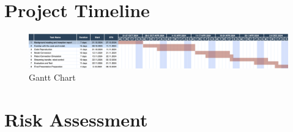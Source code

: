 \documentclass[12pt]{article}
\begin{document}
\section{Project Timeline}
\begin{figure}[H]
            \centering
            \includegraphics[width=\textwidth]{timeline.png}
            \caption{Gantt Chart}
      \end{figure}
      
\section{Risk Assessment}
\end{document}
